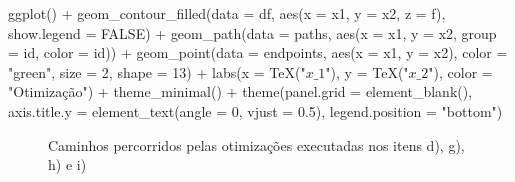 \documentclass[
  a4paperpaper,
]{article}
\newenvironment{Shaded}{\begin{snugshade}}{\end{snugshade}}
\newcommand{\AttributeTok}[1]{\textcolor[rgb]{0.40,0.45,0.13}{#1}}
\newcommand{\ConstantTok}[1]{\textcolor[rgb]{0.56,0.35,0.01}{#1}}
\newcommand{\DecValTok}[1]{\textcolor[rgb]{0.68,0.00,0.00}{#1}}
\newcommand{\FloatTok}[1]{\textcolor[rgb]{0.68,0.00,0.00}{#1}}
\newcommand{\FunctionTok}[1]{\textcolor[rgb]{0.28,0.35,0.67}{#1}}
\newcommand{\NormalTok}[1]{\textcolor[rgb]{0.00,0.23,0.31}{#1}}
\newcommand{\SpecialCharTok}[1]{\textcolor[rgb]{0.37,0.37,0.37}{#1}}
\newcommand{\StringTok}[1]{\textcolor[rgb]{0.13,0.47,0.30}{#1}}
\begin{document}
\begin{Shaded}
\begin{Highlighting}[]
\FunctionTok{ggplot}\NormalTok{() }\SpecialCharTok{+}
  \FunctionTok{geom\_contour\_filled}\NormalTok{(}\AttributeTok{data =}\NormalTok{ df, }\FunctionTok{aes}\NormalTok{(}\AttributeTok{x =}\NormalTok{ x1, }\AttributeTok{y =}\NormalTok{ x2, }\AttributeTok{z =}\NormalTok{ f), }\AttributeTok{show.legend =} \ConstantTok{FALSE}\NormalTok{) }\SpecialCharTok{+}
  \FunctionTok{geom\_path}\NormalTok{(}\AttributeTok{data =}\NormalTok{ paths, }\FunctionTok{aes}\NormalTok{(}\AttributeTok{x =}\NormalTok{ x1, }\AttributeTok{y =}\NormalTok{ x2, }\AttributeTok{group =}\NormalTok{ id, }\AttributeTok{color =}\NormalTok{ id)) }\SpecialCharTok{+}
  \FunctionTok{geom\_point}\NormalTok{(}\AttributeTok{data =}\NormalTok{ endpoints, }\FunctionTok{aes}\NormalTok{(}\AttributeTok{x =}\NormalTok{ x1, }\AttributeTok{y =}\NormalTok{ x2), }\AttributeTok{color =} \StringTok{"green"}\NormalTok{, }\AttributeTok{size =} \DecValTok{2}\NormalTok{, }\AttributeTok{shape =} \DecValTok{13}\NormalTok{) }\SpecialCharTok{+}
  \FunctionTok{labs}\NormalTok{(}\AttributeTok{x =} \FunctionTok{TeX}\NormalTok{(}\StringTok{"$x\_1$"}\NormalTok{), }\AttributeTok{y =} \FunctionTok{TeX}\NormalTok{(}\StringTok{"$x\_2$"}\NormalTok{), }\AttributeTok{color =} \StringTok{"Otimização"}\NormalTok{) }\SpecialCharTok{+}
  \FunctionTok{theme\_minimal}\NormalTok{() }\SpecialCharTok{+}
  \FunctionTok{theme}\NormalTok{(}\AttributeTok{panel.grid =} \FunctionTok{element\_blank}\NormalTok{(),}
        \AttributeTok{axis.title.y =} \FunctionTok{element\_text}\NormalTok{(}\AttributeTok{angle =} \DecValTok{0}\NormalTok{, }\AttributeTok{vjust =} \FloatTok{0.5}\NormalTok{),}
        \AttributeTok{legend.position =} \StringTok{"bottom"}\NormalTok{)}
\end{Highlighting}
\end{Shaded}

\begin{figure}[H]


\caption{\label{fig-q1j}Caminhos percorridos pelas otimizações
executadas nos itens d), g), h) e i)}

\end{figure}%
\end{document}

